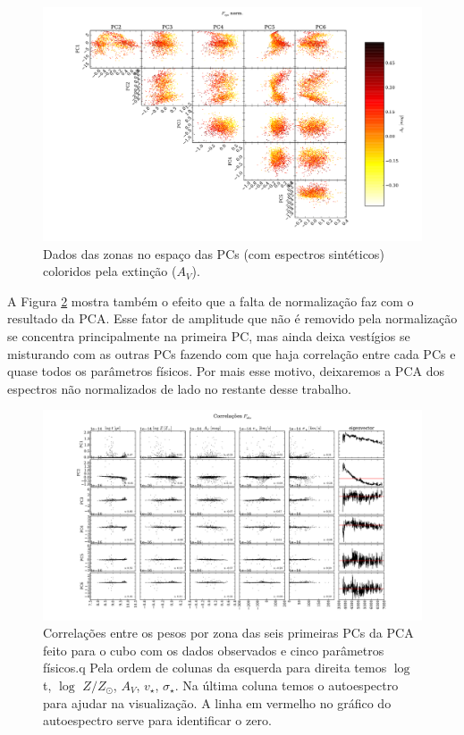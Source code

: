 \begin{figure}
	\includegraphics[width=1.4\textwidth, angle=-90]{figuras/K0277-f_syn_norm-corre_PCxPC_AV.pdf}
	\caption[Dados no espaço das PCs vs AV- $F_{syn}$ norm.]
    {Dados das zonas no espaço das PCs (com espectros sintéticos) coloridos pela extinção ($A_V$).}
    \label{fig:K0277correfsynnormPCvsPC:AV}	
\end{figure}

A Figura \ref{fig:K0277correfobs} mostra também o efeito que a falta de normalização faz com o resultado da PCA. Esse
fator de amplitude que não é removido pela normalização se concentra principalmente na primeira PC, mas ainda deixa
vestígios se misturando com as outras PCs fazendo com que haja correlação entre cada PCs e quase todos os parâmetros
físicos. Por mais esse motivo, deixaremos a PCA dos espectros não normalizados de lado no restante desse trabalho.

\begin{figure}
    \includegraphics[width=1.3\textwidth, angle=-90]{figuras/K0277-correl-f_obs-PCvsPhys.pdf}
	\caption[Correlações PCs vs. par\^ametros f\'isicos - $F_{obs}$.]
    {Correlações entre os pesos por zona das seis primeiras PCs da PCA feito para o cubo com os dados observados e cinco
    parâmetros físicos.q Pela ordem de colunas da esquerda para direita temos $\log$ t, $\log$ $Z / Z_{\odot}$, $A_V$,
    $v_{\star}$, $\sigma_{\star}$. Na última coluna temos o autoespectro para ajudar na visualização. A linha em
    vermelho no gráfico do autoespectro serve para identificar o zero.}
    \label{fig:K0277correfobs}
\end{figure}

